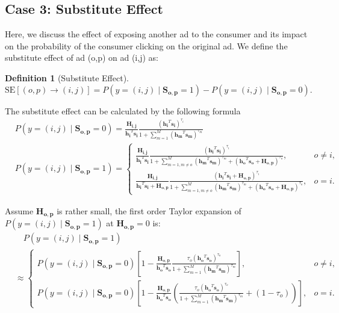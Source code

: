 \documentclass[12pt]{article}
\theoremstyle{definition}
\newtheorem{definition}{Definition}[section]
\newcommand{\matr}[1]{\mathbf{#1}} %
\begin{document}
\begin{sloppypar}
\subsection{Case 3: Substitute Effect}
Here, we discuss the effect of exposing another ad to the consumer and its impact on the probability of the consumer clicking on the original ad. We define the substitute effect of ad (o,p) on ad (i,j) as:
\begin{definition}[Substitute Effect]
    \begin{equation*}
        \mathrm{SE}[(o,p) \rightarrow (i,j)] = P(y=(i,j) \mid \matr{S_{o,p}}=1) - P(y=(i,j) \mid \matr{S_{o,p}}=0).
    \end{equation*}
\end{definition}

The substitute effect can be calculated by the following formula 
\begin{align*}
    &P(y=(i,j) \mid \matr{S_{o,p}}=0) =  \frac{\matr{H_{i,j}}}
    {\matr{h_i}^T \matr{s_i}} \frac{(\matr{h_i}^T \matr{s_i})^{\tau_i}}{1+\sum_{m=1}^{M} (\matr{h_m}^T\matr{s_m})^{\tau_m}}\\
    &P(y=(i,j) \mid \matr{S_{o,p}} = 1)=
    \begin{cases}
        \frac{\matr{H_{i,j}}}
        {\matr{h_i}^T \matr{s_i}} \frac{(\matr{h_i}^T \matr{s_i})^{\tau_i}}{1+\sum
        \limits_{m=1, m \neq o}^{M} (\matr{h_m}^T\matr{s_m})^{\tau_m}+(\matr{h_o}^T \matr{s_o}+\matr{H_{o,p}})^{\tau_o}}, &o \neq i,\\
        \frac{\matr{H_{i,j}}}
        {\matr{h_i}^T \matr{s_i}+\matr{H_{o,p}}} \frac{(\matr{h_i}^T \matr{s_i}+\matr{H_{o,p}})^{\tau_i}}{1+\sum\limits_{m=1, m \neq o}^{M} (\matr{h_m}^T\matr{s_m})^{\tau_m}+(\matr{h_o}^T \matr{s_o}+\matr{H_{o,p}})^{\tau_o}}, &o = i.
    \end{cases}
\end{align*}

Assume $\matr{H_{o,p}}$ is rather small, the first order Taylor expansion of\\ $P(y=(i,j) \mid \matr{S_{o,p}} = 1)$ at $\matr{H_{o,p}}=0$ is:
\begin{align}\label{p proun}
    &\quad P(y=(i,j) \mid \matr{S_{o,p}} = 1) \nonumber\\
    &\approx
    \begin{cases}
        P(y=(i,j) \mid \matr{S_{o,p}} = 0)[1-\frac{\matr{H_{o,p}}}{\matr{h_o}^T \matr{s_o}}\frac{\tau_o(\matr{h_o}^T \matr{s_o})^{\tau_o}}{1+\sum_{m=1}^{M} (\matr{h_m}^T\matr{s_m})^{\tau_m}}], &o \neq i,\\
        P(y=(i,j) \mid \matr{S_{o,p}} = 0)[1-\frac{\matr{H_{o,p}}}{\matr{h_o}^T \matr{s_o}}(\frac{\tau_o(\matr{h_o}^T\matr{s_o})^{\tau_o}}{1+\sum_{m=1}^{M} (\matr{h_m}^T\matr{s_m})^{\tau_m}}+(1-\tau_o))], &o = i.
    \end{cases}
\end{align}


\end{sloppypar}
\end{document}
